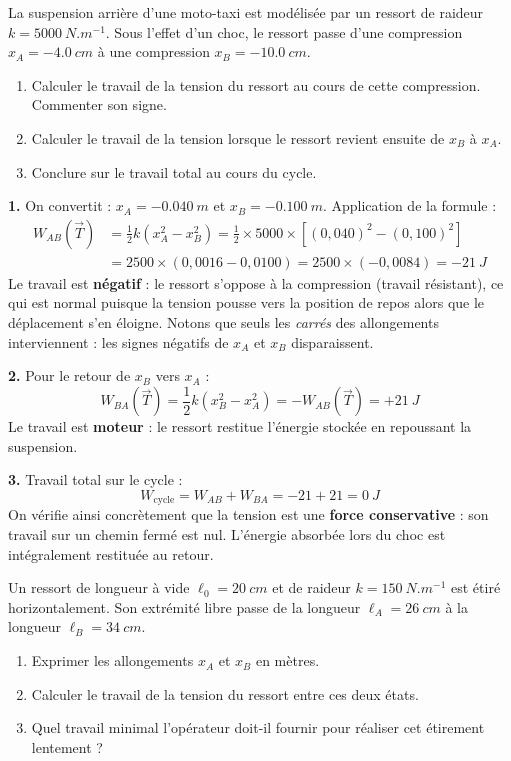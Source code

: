 \documentclass[11pt]{article}
\begin{document}
\begin{exoresolu}
La suspension arrière d'une moto-taxi est modélisée par un ressort de raideur $k = \SI{5000}{N.m^{-1}}$. Sous l'effet d'un choc, le ressort passe d'une compression $x_A = -\SI{4,0}{cm}$ à une compression $x_B = -\SI{10,0}{cm}$.

\begin{enumerate}
\item Calculer le travail de la tension du ressort au cours de cette compression. Commenter son signe.
\item Calculer le travail de la tension lorsque le ressort revient ensuite de $x_B$ à $x_A$.
\item Conclure sur le travail total au cours du cycle.
\end{enumerate}

\tcblower

\textbf{1.} On convertit : $x_A = -\SI{0,040}{m}$ et $x_B = -\SI{0,100}{m}$. Application de la formule :
\begin{align*}
W_{AB}(\vec{T}) &= \frac{1}{2}k\left(x_A^2 - x_B^2\right) = \frac{1}{2}\times 5000 \times \left[(0,040)^2 - (0,100)^2\right] \\
&= 2500 \times (0,0016 - 0,0100) = 2500 \times (-0,0084) = -\SI{21}{J}
\end{align*}
Le travail est \textbf{négatif} : le ressort s'oppose à la compression (travail résistant), ce qui est normal puisque la tension pousse vers la position de repos alors que le déplacement s'en éloigne. Notons que seuls les \emph{carrés} des allongements interviennent : les signes négatifs de $x_A$ et $x_B$ disparaissent.

\textbf{2.} Pour le retour de $x_B$ vers $x_A$ :
\[
W_{BA}(\vec{T}) = \frac{1}{2}k\left(x_B^2 - x_A^2\right) = -W_{AB}(\vec{T}) = +\SI{21}{J}
\]
Le travail est \textbf{moteur} : le ressort restitue l'énergie stockée en repoussant la suspension.

\textbf{3.} Travail total sur le cycle :
\[
W_{\text{cycle}} = W_{AB} + W_{BA} = -21 + 21 = \SI{0}{J}
\]
On vérifie ainsi concrètement que la tension est une \textbf{force conservative} : son travail sur un chemin fermé est nul. L'énergie absorbée lors du choc est intégralement restituée au retour.
\end{exoresolu}

\begin{exercice}
Un ressort de longueur à vide $\ell_0 = \SI{20}{cm}$ et de raideur $k = \SI{150}{N.m^{-1}}$ est étiré horizontalement. Son extrémité libre passe de la longueur $\ell_A = \SI{26}{cm}$ à la longueur $\ell_B = \SI{34}{cm}$.
\begin{enumerate}
\item Exprimer les allongements $x_A$ et $x_B$ en mètres.
\item Calculer le travail de la tension du ressort entre ces deux états.
\item Quel travail minimal l'opérateur doit-il fournir pour réaliser cet étirement lentement ?
\end{enumerate}
\end{exercice}
\end{document}
